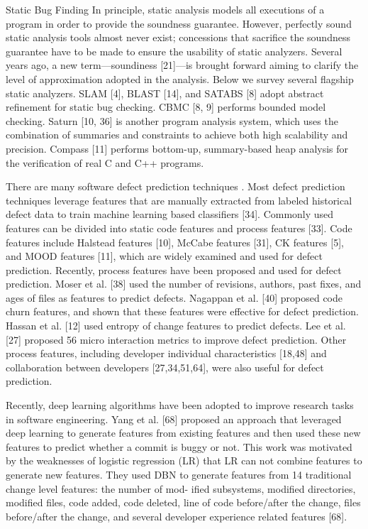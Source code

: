 \documentclass{article}
\begin{document}
Static Bug Finding In principle, static analysis models all executions of a program in order to provide the soundness guarantee. However, perfectly sound static analysis tools almost never exist; concessions that sacrifice the soundness guarantee have to be made to ensure the usability of static analyzers. Several years ago, a new term—soundiness [21]—is brought forward aiming to clarify the level of approximation adopted in the analysis. Below we survey several flagship static analyzers. SLAM [4], BLAST [14], and SATABS [8] adopt abstract refinement for static bug checking. CBMC [8, 9] performs bounded model checking. Saturn [10, 36] is another program analysis system, which uses the combination of summaries and constraints to achieve both high scalability and precision. Compass [11] performs bottom-up, summary-based heap analysis for the verification of real C and C++ programs.

There are many software defect prediction techniques . Most defect prediction techniques leverage features that are manually extracted from labeled historical defect data to train machine learning based classifiers [34]. Commonly used features can be divided into static code features and process features [33]. Code features include Halstead features [10], McCabe features [31], CK features [5], and MOOD features [11], which are widely examined and used for defect prediction. Recently, process features have been proposed and used for defect prediction. Moser et al. [38] used the number of revisions, authors, past fixes, and ages of files as features to predict defects. Nagappan et al. [40] proposed code churn features, and shown that these features were effective for defect prediction. Hassan et al. [12] used entropy of change features to predict defects. Lee et al. [27] proposed 56 micro interaction metrics to improve defect prediction. Other process features, including developer individual characteristics [18,48] and collaboration between developers [27,34,51,64], were also useful for defect prediction.

Recently, deep learning algorithms have been adopted to improve research tasks in software engineering. Yang et al. [68] proposed an approach that leveraged deep learning to generate features from existing features and then used these new features to predict whether a commit is buggy or not. This work was motivated by the weaknesses of logistic regression (LR) that LR can not combine features to generate new features. They used DBN to generate features from 14 traditional change level features: the number of mod- ified subsystems, modified directories, modified files, code added, code deleted, line of code before/after the change, files before/after the change, and several developer experience related features [68].
\end{document}
